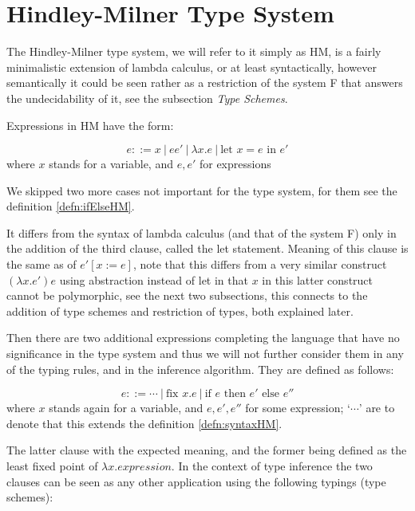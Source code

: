 \section{Hindley-Milner Type System}

The Hindley-Milner type system, we will refer to it simply as HM, is a fairly minimalistic extension of lambda calculus, or at least syntactically, however semantically it could be seen rather as a restriction of the system F that answers the undecidability of it, see the subsection \emph{Type Schemes}.

Expressions in HM have the form:

\begin{defn}[HM expressions]
    \label{defn:syntaxHM}
    $$e ::= x\ |\ e e'\ |\ \lambda x . e\ |\ \text{let } x = e \text{ in } e'$$
    where $x$ stands for a variable, and $e, e'$ for expressions
\end{defn}

We skipped two more cases not important for the type system, for them see the definition \ref{defn:ifElseHM}.

It differs from the syntax of lambda calculus (and that of the system F) only in the addition of the third clause, called the let statement. Meaning of this clause is the same as of $e' [x := e]$, note that this differs from a very similar construct $(\lambda x . e') e$ using abstraction instead of let in that $x$ in this latter construct cannot be polymorphic, see the next two subsections, this connects to the addition of type schemes and restriction of types, both explained later. %

Then there are two additional expressions completing the language that have no significance in the type system and thus we will not further consider them in any of the typing rules, and in the inference algorithm. They are defined as follows:

\begin{defn}
    \label{defn:ifElseHM}
    $$e ::= \cdots\ |\ \text{fix } x . e\ |\ \text{if } e \text{ then } e' \text{ else } e''$$
    where $x$ stands again for a variable, and $e, e', e''$ for some expression; `$\cdots$' are to denote that this extends the definition \ref{defn:syntaxHM}.
\end{defn}

The latter clause with the expected meaning, and the former being defined as the least fixed point of $\lambda x . expression$. In the context of type inference the two clauses can be seen as any other application using the following typings (type schemes):

